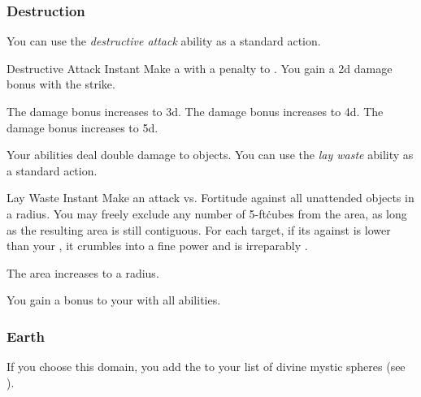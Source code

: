         \subsubsection{Destruction}
             You can use the \textit{destructive attack} ability as a standard action.
            \begin{instantability}{Destructive Attack}
                Instant
                \rankline
                Make a  with a  penalty to .
                You gain a \plus2d damage bonus with the strike.

                \rankline
                 The damage bonus increases to \plus3d.
                 The damage bonus increases to \plus4d.
                 The damage bonus increases to \plus5d.
            \end{instantability}
             Your abilities deal double damage to objects.
             You can use the \textit{lay waste} ability as a standard action.
            \begin{instantability}{Lay Waste}
                Instant
                \rankline
                Make an attack vs. Fortitude against all unattended objects in a \areamed radius.
                You may freely exclude any number of 5-ft\. cubes from the area, as long as the resulting area is still contiguous.
                \hit For each target, if its  against  is lower than your , it crumbles into a fine power and is irreparably .

                \rankline
                 The area increases to a \arealarge radius.
            \end{instantability}
             You gain a  bonus to your  with all abilities.

        \subsubsection{Earth}
            If you choose this domain, you add the   to your list of divine mystic spheres (see ).

